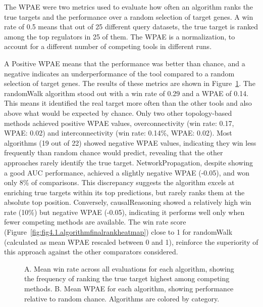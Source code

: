 The \gls{WPAE} were two metrics used to evaluate how often an algorithm ranks the true targets and the performance over a random selection of target genes. A win rate of 0.5 means that out of 25 different query datasets, the true target is ranked among the top regulators in 25 of them. The \gls{WPAE} is a normalization, to account for a different number of competing tools in different runs. 

A Positive \gls{WPAE} means that the performance was better than chance, and a negative indicates an underperformance of the tool compared to a random selection of target genes. The results of these metrics are shown in Figure~\ref{fig:fig4.3.WinandWPAE}. The randomWalk algorithm stood out with a win rate of 0.29 and a \gls{WPAE} of 0.14. This means it identified the real target more often than the other tools and also above what would be expected by chance. Only two other topology-based methods achieved positive WPAE values, overconnectivity (win rate: 0.17, WPAE: 0.02) and interconnectivity (win rate: 0.14\%, \gls{WPAE}: 0.02).  Most algorithms (19 out of 22) showed negative \gls{WPAE} values, indicating they win less frequently than random chance would predict, revealing that the other approaches rarely identify the true target. NetworkPropagation, despite showing a good \gls{AUC} performance, achieved a slightly negative \gls{WPAE} (-0.05), and won only 8\% of comparisons. This discrepancy suggests the algorithm excels at enriching true targets within its top predictions, but rarely ranks them at the absolute top position. Conversely, causalReasoning showed a relatively high win rate (10\%) but negative \gls{WPAE} (-0.05), indicating it performs well only when fewer competing methods are available. The win rate score (Figure~\ref{fig:fig4.1.algorithmfinalrankheatmap}) close to 1 for randomWalk (calculated as mean \gls{WPAE} rescaled between 0 and 1), reinforce the superiority of this approach against the other comparators considered.



\begin{figure}[htbp]
  \centering
  \caption[Mean win rate and WPAE across all evaluations for each algorithm.]{A. Mean win rate across all evaluations for each algorithm, showing the frequency of ranking the true target highest among competing methods. B. Mean \gls{WPAE} for each algorithm, showing performance relative to random chance. Algorithms are colored by category.}
  \label{fig:fig4.3.WinandWPAE}
\end{figure}

